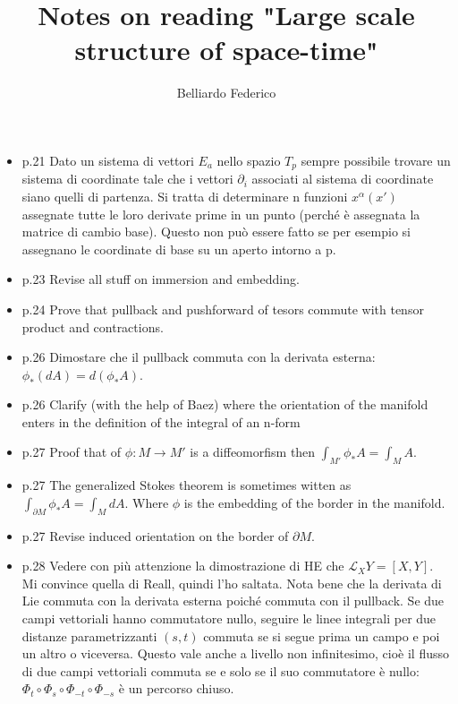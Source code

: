 \documentclass[10pt,a4paper]{article}
\author{Belliardo Federico}
\title{Notes on reading "Large scale structure of space-time"}
\begin{document}
\maketitle
\begin{itemize}
\item p.21 Dato un sistema di vettori $E_a$ nello spazio $T_{p}$  sempre possibile trovare un sistema di coordinate tale che i vettori $\partial_{i}$ associati al sistema di coordinate siano quelli di partenza. Si tratta di determinare n funzioni $x^{\alpha}(x')$ assegnate tutte le loro derivate prime in un punto (perché è assegnata la matrice di cambio base). Questo non può essere fatto se per esempio si assegnano le coordinate di base su un aperto intorno a p.

\item p.23 Revise all stuff on immersion and embedding.
\item p.24 Prove that pullback and pushforward of tesors commute with tensor product and contractions.

\item p.26 Dimostare che il pullback commuta con la derivata esterna: $\phi_{*}(dA) = d(\phi_{*}A)$.

\item p.26 Clarify (with the help of Baez) where the orientation of the manifold enters in the definition of the integral of an n-form

\item p.27 Proof that of $\phi: M \rightarrow M'$ is a diffeomorfism then $\int_{M'} \phi_{*} A = \int_{M} A$.

\item p.27 The generalized Stokes theorem is sometimes witten as  $\int_{\partial M} \phi_{*} A = \int_{M} dA$. Where $\phi$ is the embedding of the border in the manifold.

\item p.27 Revise induced orientation on the border of $\partial M$.

\item p.28 Vedere con più attenzione la dimostrazione di HE che $\mathcal{L}_{X}Y = [X, Y]$. Mi convince quella di Reall, quindi l'ho saltata. Nota bene che la derivata di Lie commuta con la derivata esterna poiché commuta con il pullback. Se due campi vettoriali hanno commutatore nullo, seguire le linee integrali per due distanze parametrizzanti $(s, t)$ commuta se si segue prima un campo e poi un altro o viceversa. Questo vale anche a livello non infinitesimo, cioè il flusso di due campi vettoriali commuta se e solo se il suo commutatore è nullo: $\Phi_t \circ \Phi_s \circ \Phi_{-t} \circ \Phi_{-s}$ è un percorso chiuso. 


\end{itemize}
\end{document}
